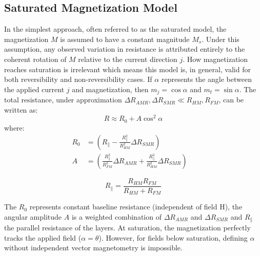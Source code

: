 \documentclass[11pt,a4paper]{article}
\begin{document}
\subsection{Saturated Magnetization Model}
In the simplest approach, often referred to as the saturated model, the magnetization $M$ is assumed to have a constant magnitude $M_{s}$. Under this assumption, any observed variation in resistance is attributed entirely to the coherent rotation of $M$ relative to the current direction $j$. How magnetization reaches saturation is irrelevant which means this model is, in general, valid for both reversibility and non-reversibility cases. If $\alpha$ represents the angle between the applied current $j$ and magnetization, then $m_j = \cos \alpha$ and $m_t = \sin \alpha$. The total resistance, under approximation $\Delta R_{AMR}, \Delta R_{SMR} \ll R_{HM}, R_{FM}$, can be written as:
\begin{equation}
    R \approx R_0 + A\cos^2 \alpha
\end{equation}
where:
\begin{align}
    R_0 &= \left( R_{\parallel} - \frac{R_{\parallel}^2}{R_{HM}^2}\Delta R_{SMR} \right) \quad  \\
    A &= \left( \frac{R_{\parallel}^2}{R_{FM}^2}\Delta R_{AMR} + \frac{R_{\parallel}^2}{R_{HM}^2}\Delta R_{SMR} \right) \quad 
\end{align}

\begin{equation}
    R_{\parallel} = \frac{R_{HM}R_{FM}}{R_{HM}+R_{FM}}
\end{equation}

The $R_0$ represents constant baseline resistance (independent of field H), the angular amplitude $A$ is a weighted combination of $\Delta R_{AMR}$ and $\Delta R_{SMR}$ and $R_{\parallel}$ the parallel resistance of the layers. At saturation, the magnetization perfectly tracks the applied field ($\alpha = \theta$). However, for fields below saturation, defining $\alpha$ without independent vector magnetometry is impossible.
\end{document}
